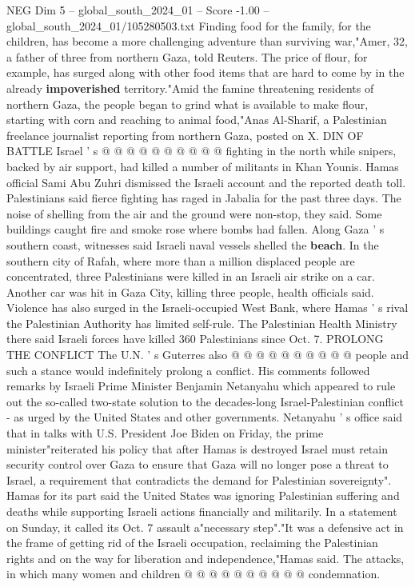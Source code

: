 \begin{textsample}{NEG Dim 5 – global\_south\_2024\_01 – Score -1.00 – global\_south\_2024\_01/105280503.txt}
Finding food for the family, for the children, has become a more challenging adventure than surviving war,"Amer, 32, a father of three from northern Gaza, told Reuters.
The price of flour, for example, has surged along with other food items that are hard to come by in the already \textbf{impoverished} territory."Amid the famine threatening residents of northern Gaza, the people began to grind what is available to make flour, starting with corn and reaching to animal food,"Anas Al-Sharif, a Palestinian freelance journalist reporting from northern Gaza, posted on X.
DIN OF BATTLE Israel ' s @ @ @ @ @ @ @ @ @ @ fighting in the north while snipers, backed by air support, had killed a number of militants in Khan Younis.
Hamas official Sami Abu Zuhri dismissed the Israeli account and the reported death toll.
Palestinians said fierce fighting has raged in Jabalia for the past three days.
The noise of shelling from the air and the ground were non-stop, they said.
Some buildings caught fire and smoke rose where bombs had fallen.
Along Gaza ' s southern coast, witnesses said Israeli naval vessels shelled the \textbf{beach}.
In the southern city of Rafah, where more than a million displaced people are concentrated, three Palestinians were killed in an Israeli air strike on a car.
Another car was hit in Gaza City, killing three people, health officials said.
Violence has also surged in the Israeli-occupied West Bank, where Hamas ' s rival the Palestinian Authority has limited self-rule.
The Palestinian Health Ministry there said Israeli forces have killed 360 Palestinians since Oct. 7.
PROLONG THE CONFLICT The U.N. ' s Guterres also @ @ @ @ @ @ @ @ @ @ people and such a stance would indefinitely prolong a conflict.
His comments followed remarks by Israeli Prime Minister Benjamin Netanyahu which appeared to rule out the so-called two-state solution to the decades-long Israel-Palestinian conflict - as urged by the United States and other governments.
Netanyahu ' s office said that in talks with U.S.
President Joe Biden on Friday, the prime minister"reiterated his policy that after Hamas is destroyed Israel must retain security control over Gaza to ensure that Gaza will no longer pose a threat to Israel, a requirement that contradicts the demand for Palestinian sovereignty".
Hamas for its part said the United States was ignoring Palestinian suffering and deaths while supporting Israeli actions financially and militarily.
In a statement on Sunday, it called its Oct. 7 assault a"necessary step"."It was a defensive act in the frame of getting rid of the Israeli occupation, reclaiming the Palestinian rights and on the way for liberation and independence,"Hamas said.
The attacks, in which many women and children @ @ @ @ @ @ @ @ @ @ condemnation.

\end{textsample}
